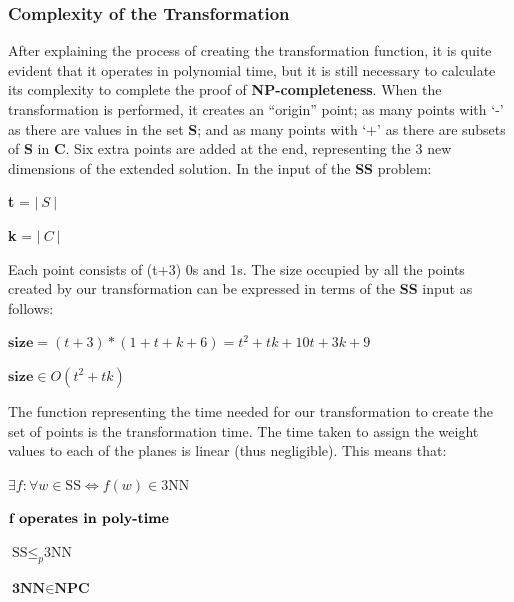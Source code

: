 \documentclass[../main]{subfiles}
\begin{document}
\subsubsection{Complexity of the Transformation}
After explaining the process of creating the transformation function, it is quite evident that it operates in polynomial time, but it is still necessary to calculate its complexity to complete the proof of \textbf{NP-completeness}. When the transformation is performed, it creates an ``origin'' point; as many points with `-' as there are values in the set \textbf{S}; and as many points with `+' as there are subsets of \textbf{S} in \textbf{C}. Six extra points are added at the end, representing the 3 new dimensions of the extended solution. In the input of the \textbf{SS} problem:
\begin{center}
    \textbf{t} = $| \ S \ |$

    \textbf{k} = $| \ C \ |$
\end{center}
Each point consists of (t+3) 0s and 1s. The size occupied by all the points created by our transformation can be expressed in terms of the \textbf{SS} input as follows:
\begin{center}
        $\textbf{size} = (t+3)*(1 + t + k + 6) = t^2 + tk + 10t + 3k + 9$

        $\textbf{size} \in O(t^2 + tk)$
\end{center}
The function representing the time needed for our transformation to create the set of points is the transformation time. The time taken to assign the weight values to each of the planes is linear (thus negligible). This means that:

\begin{center}
    $\exists f : \forall w \in \text{SS} \Longleftrightarrow f(w) \in \text{3NN}$

    $\textbf{\textbf{f operates in poly-time}}$

    $\text{SS} \leq_p \text{3NN} $

    $\textbf{3NN} \in \textbf{NPC}$
\end{center}
\end{document}
